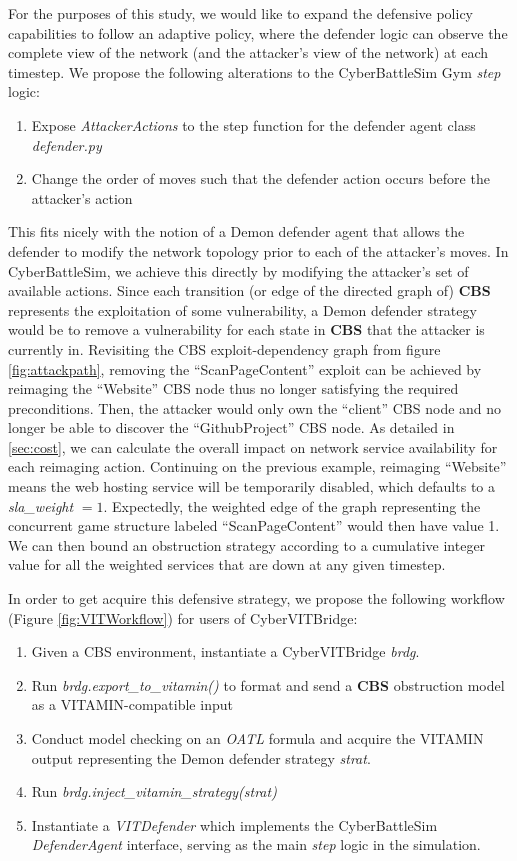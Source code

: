 For the purposes of this study, we would like to expand the defensive policy capabilities to follow an adaptive policy, where the defender logic can observe the complete view of the network (and the attacker's view of the network) at each timestep. We propose the following alterations to the CyberBattleSim Gym \textit{step} logic:
\begin{enumerate}
    \item Expose \textit{AttackerActions} to the step function for the defender agent class \textit{defender.py}
    \item Change the order of moves such that the defender action occurs before the attacker's action
\end{enumerate}
This fits nicely with the notion of a Demon defender agent that allows the defender to modify the network topology prior to each of the attacker's moves. In CyberBattleSim, we achieve this directly by modifying the attacker's set of available actions. Since each transition (or edge of the directed graph of) \textbf{CBS} represents the exploitation of some vulnerability, a Demon defender strategy would be to remove a vulnerability for each state in \textbf{CBS} that the attacker is currently in. Revisiting the CBS exploit-dependency graph from figure \ref{fig:attackpath}, removing the ``ScanPageContent'' exploit can be achieved by reimaging the ``Website'' CBS node thus no longer satisfying the required preconditions. Then, the attacker would only own the ``client'' CBS node and no longer be able to discover the ``GithubProject'' CBS node. As detailed in \ref{sec:cost}, we can calculate the overall impact on network service availability for each reimaging action. Continuing on the previous example, reimaging ``Website'' means the web hosting service will be temporarily disabled, which defaults to a \textit{sla\_weight} $= 1$. Expectedly, the weighted edge of the graph representing the concurrent game structure labeled ``ScanPageContent'' would then have value 1. We can then bound an obstruction strategy according to a cumulative integer value for all the weighted services that are down at any given timestep.

In order to get acquire this defensive strategy, we propose the following workflow (Figure \ref{fig:VITWorkflow}) for users of CyberVITBridge:

\begin{enumerate}
    \item Given a CBS environment, instantiate a CyberVITBridge \textit{brdg}.
    \item Run \textit{brdg.export\_to\_vitamin()} to format and send a \textbf{CBS} obstruction model as a VITAMIN-compatible input
    \item Conduct model checking on an \textit{OATL} formula and acquire the VITAMIN output representing the Demon defender strategy \textit{strat}.
    \item Run \textit{brdg.inject\_vitamin\_strategy(strat)}
    \item Instantiate a \textit{VITDefender} which implements the CyberBattleSim \textit{DefenderAgent} interface, serving as the main \textit{step} logic in the simulation.
\end{enumerate}

